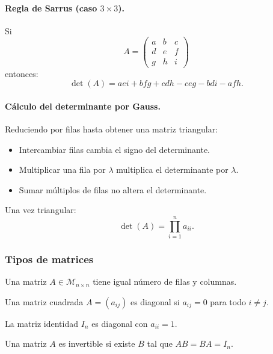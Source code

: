 \documentclass[10pt]{article}
\begin{document}
\paragraph{Regla de Sarrus (caso $3\times 3$).}

Si 
\[
A =
\begin{pmatrix}
a & b & c \\
d & e & f \\
g & h & i
\end{pmatrix}
\]
entonces:
\[
\det(A) = aei + bfg + cdh - ceg - bdi - afh.
\]

\paragraph{Cálculo del determinante por Gauss.}

Reduciendo por filas hasta obtener una matriz triangular:
\begin{itemize}
  \item Intercambiar filas cambia el signo del determinante.
  \item Multiplicar una fila por $\lambda$ multiplica el determinante por $\lambda$.
  \item Sumar múltiplos de filas no altera el determinante.
\end{itemize}
Una vez triangular:
\[
\det(A) = \prod_{i=1}^n a_{ii}.
\]

\subsubsection{Tipos de matrices}

\begin{definition}
  Una matriz $A \in \mathcal{M}_{n \times n}$ tiene igual número de filas y columnas.
\end{definition}

\begin{definition}
  Una matriz cuadrada $A = (a_{ij})$ es diagonal si $a_{ij} = 0$ para todo $i \neq j$.
\end{definition}

\begin{definition}
  La matriz identidad $I_n$ es diagonal con $a_{ii}=1$.
\end{definition}

\begin{definition}
  Una matriz $A$ es invertible si existe $B$ tal que $AB = BA = I_n$.
\end{definition}
\end{document}
